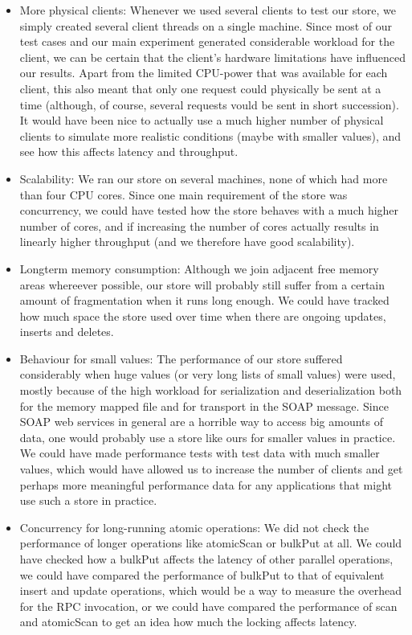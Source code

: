 \documentclass[12pt,a4paper]{article}
\begin{document}
\begin{itemize}
  \item More physical clients: Whenever we used several clients to test our store, we simply created several client threads on a single machine. Since most of our test cases and our main experiment generated considerable workload for the client, we can be certain that the client's hardware limitations have influenced our results. Apart from the limited CPU-power that was available for each client, this also meant that only one request could physically be sent at a time (although, of course, several requests vould be sent in short succession). It would have been nice to actually use a much higher number of physical clients to simulate more realistic conditions (maybe with smaller values), and see how this affects latency and throughput. 
  \item Scalability: We ran our store on several machines, none of which had more than four CPU cores. Since one main requirement of the store was concurrency, we could have tested how the store behaves with a much higher number of cores, and if increasing the number of cores actually results in linearly higher throughput (and we therefore have good scalability).
  \item Longterm memory consumption: Although we join adjacent free memory areas whereever possible, our store will probably still suffer from a certain amount of fragmentation when it runs long enough. We could have tracked how much space the store used over time when there are ongoing updates, inserts and deletes.
  \item Behaviour for small values: The performance of our store suffered considerably when huge values (or very long lists of small values) were used, mostly because of the high workload for serialization and deserialization both for the memory mapped file and for transport in the SOAP message. Since SOAP web services in general are a horrible way to access big amounts of data, one would probably use a store like ours for smaller values in practice. We could have made performance tests with test data with much smaller values, which would have allowed us to increase the number of clients and get perhaps more meaningful performance data for any applications that might use such a store in practice.
  \item Concurrency for long-running atomic operations: We did not check the performance of longer operations like atomicScan or bulkPut at all. We could have checked how a bulkPut affects the latency of other parallel operations, we could have compared the performance of bulkPut to that of equivalent insert and update operations, which would be a way to measure the overhead for the RPC invocation, or we could have compared the performance of scan and atomicScan to get an idea how much the locking affects latency.

\end{itemize}
\end{document}
